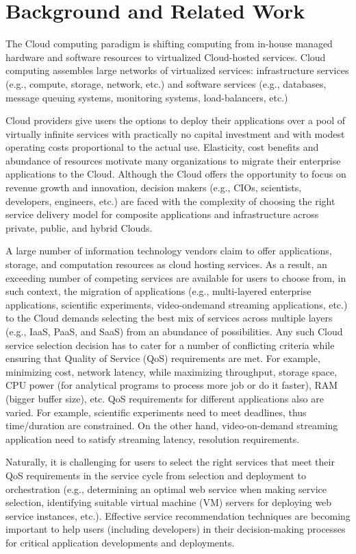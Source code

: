 \chapter{Background and Related Work}
\label{cha:background}
The Cloud computing paradigm is shifting computing from in-house managed
hardware and software resources to virtualized Cloud-hosted
services.
Cloud computing assembles large networks of virtualized services:
infrastructure services (e.g., compute, storage, network, etc.) and software services
(e.g., databases, message queuing systems, monitoring systems, load-balancers, etc.)

Cloud providers give users the options to deploy their applications over a pool
of virtually infinite services with practically no capital
investment and with modest operating costs proportional to
the actual use. Elasticity, cost benefits and abundance of
resources motivate many organizations to migrate their
enterprise applications to the Cloud. Although the Cloud offers
the opportunity to focus on revenue growth and innovation,
decision makers (e.g., CIOs, scientists, developers,
engineers, etc.) are faced with the complexity of choosing
the right service delivery model for composite applications
and infrastructure across private, public, and hybrid Clouds.

A large number of information technology vendors claim to offer applications, storage,
and computation resources as cloud hosting services. As a
result, an exceeding number of competing services are available for
users to choose from, in such context, the migration of applications 
(e.g., multi-layered enterprise applications, scientific experiments, 
video-ondemand streaming applications, etc.) to the Cloud
demands selecting the best mix of services across multiple
layers (e.g., IaaS, PaaS, and SaaS) from an abundance of
possibilities. 
Any such Cloud service selection decision has
to cater for a number of conflicting criteria while ensuring that 
Quality of Service (QoS) requirements are met. For example, minimizing cost,
network latency, while maximizing throughput, storage space, CPU power (for analytical
programs to process more job or do it faster), RAM (bigger buffer size), etc.
QoS requirements for different applications also are varied. 
For example, scientific experiments need to meet deadlines, thus time/duration are constrained. 
On the other hand, video-on-demand streaming application need to satisfy streaming latency, resolution requirements.

Naturally, it is challenging for users to
select the right services that meet their QoS requirements in the
service cycle from selection and deployment to orchestration
(e.g., determining an optimal web service when making service
selection, identifying suitable virtual machine (VM) servers for
deploying web service instances, etc.). Effective service
recommendation techniques are becoming important to help
users (including developers) in their decision-making processes
for critical application developments and deployments. 

